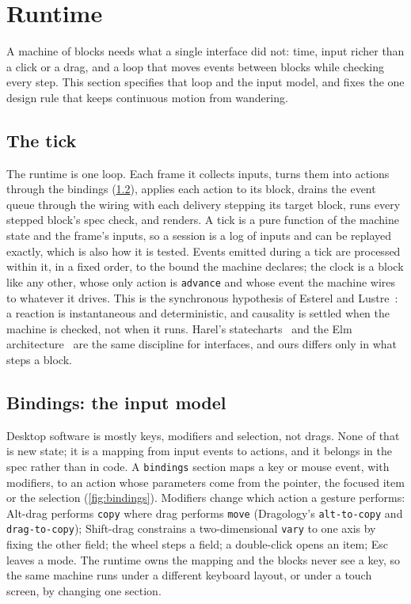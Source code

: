 \section{Runtime}
\label{sec:runtime}

A machine of blocks needs what a single interface did not: time, input richer than a click or a drag, and a
loop that moves events between blocks while checking every step. This section specifies that loop and the input
model, and fixes the one design rule that keeps continuous motion from wandering.

\subsection{The tick}
\label{sec:tick}

The runtime is one loop. Each frame it collects inputs, turns them into actions through the bindings
(\cref{sec:bindings}), applies each action to its block, drains the event queue through the wiring with each
delivery stepping its target block, runs every stepped block's spec check, and renders. A tick is a pure
function of the machine state and the frame's inputs, so a session is a log of inputs and can be replayed
exactly, which is also how it is tested. Events emitted during a tick are processed within it, in a fixed order,
to the bound the machine declares; the clock is a block like any other, whose only action is \texttt{advance} and
whose event the machine wires to whatever it drives. This is the synchronous hypothesis of
Esterel and Lustre~\citep{berry1992esterel,halbwachs1991lustre}: a reaction is instantaneous and deterministic,
and causality is settled when the machine is checked, not when it runs. Harel's statecharts~\citep{harel1987statecharts}
and the Elm architecture~\citep{czaplicki2013elm} are the same discipline for interfaces, and ours differs only
in what steps a block.

\subsection{Bindings: the input model}
\label{sec:bindings}

Desktop software is mostly keys, modifiers and selection, not drags. None of that is new state; it is a mapping
from input events to actions, and it belongs in the spec rather than in code. A \texttt{bindings} section maps
a key or mouse event, with modifiers, to an action whose parameters come from the pointer, the focused item or
the selection (\cref{fig:bindings}). Modifiers change which action a gesture performs: Alt-drag performs
\texttt{copy} where drag performs \texttt{move} (Dragology's \texttt{alt-to-copy} and \texttt{drag-to-copy});
Shift-drag constrains a two-dimensional \texttt{vary} to one axis by fixing the other field; the wheel steps a
field; a double-click opens an item; Esc leaves a mode. The runtime owns the mapping and the blocks never see a
key, so the same machine runs under a different keyboard layout, or under a touch screen, by changing one
section.

